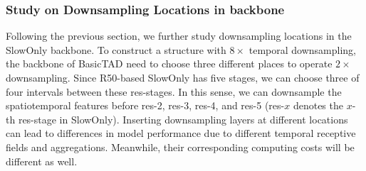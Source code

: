 \documentclass[a4paper,fleqn]{cas-dc}
\begin{document}
\begin{table*}[t]
\centering
\small
\caption{\textbf{Comparison between three kinds of the neck on THUMOS14~\citep{THUMOS14}}. We test three different kinds of neck and compare the results on THUMOS14. We denote the down-sampling operator of Lateral-TFPN as ``-'' because it uses the multi-scale feature from the backbone.}
\label{table:neck_operator}
\setlength\tabcolsep{3.3mm}
\end{table*}




\noindent
\subsubsection{Study on Downsampling Locations in backbone}
Following the previous section, we further study downsampling locations in the SlowOnly backbone.
To construct a structure with $8\times$ temporal downsampling, the backbone of BasicTAD need to choose three different places to operate $2\times$ downsampling.
Since R50-based SlowOnly has five stages, we can choose three of four intervals between these res-stages. In this sense, we can downsample the spatiotemporal features before res-2, res-3, res-4, and res-5 (res-$x$ denotes the $x$-th res-stage in SlowOnly). Inserting downsampling layers at different locations can lead to differences in model performance due to different temporal receptive fields and aggregations. Meanwhile, their corresponding computing costs will be different as well.
\end{document}
